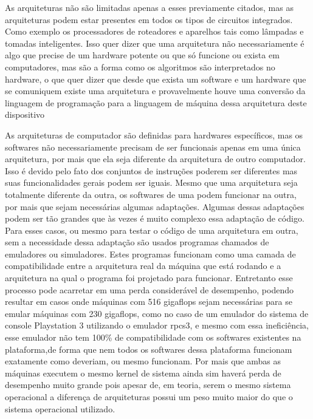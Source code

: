 \documentclass[
	12pt,				%
	openright,			%
	oneside,			%
	a4paper,			%
	english,			%
	french,				%
	spanish,			%
	brazil,				%
	]{abntex2}
\begin{document}
As arquiteturas não são limitadas apenas a esses previamente citados, mas as arquiteturas podem estar presentes em todos os tipos de circuitos integrados. Como exemplo os processadores de roteadores e aparelhos  tais como lâmpadas e tomadas inteligentes. Isso quer dizer que uma arquitetura não necessariamente é algo que precise de um hardware potente ou que só funcione ou exista em computadores, mas são a forma como os algoritmos são interpretados no hardware, o que quer dizer que desde que exista um software e um hardware que se comuniquem existe uma arquitetura e provavelmente houve uma conversão da linguagem de programação para a linguagem de máquina dessa arquitetura deste dispositivo\newline

As arquiteturas de computador são definidas para hardwares específicos, mas os softwares não necessariamente precisam de ser funcionais apenas em uma única arquitetura, por mais que ela seja diferente da arquitetura de outro computador. Isso é devido pelo fato dos conjuntos de instruções poderem ser diferentes mas suas funcionalidades gerais podem ser iguais. Mesmo que uma arquitetura seja totalmente diferente da outra, os softwares de uma podem funcionar na outra, por mais que sejam necessárias algumas adaptações. Algumas dessas adaptações podem ser tão grandes que às vezes é muito complexo essa adaptação de código. Para esses casos, ou mesmo para testar o código de uma arquitetura em outra, sem a necessidade dessa adaptação são usados programas chamados de emuladores ou simuladores. Estes programas funcionam como uma camada de compatibilidade entre a arquitetura real da máquina que está rodando e a arquitetura na qual o programa foi projetado para funcionar. Entretanto esse processo pode acarretar em uma perda considerável de desempenho, podendo resultar em casos onde máquinas com  516 gigaflops sejam necessárias para se emular máquinas com 230 gigaflops, como no caso de um emulador do sistema de console Playstation 3 utilizando o emulador rpcs3, e mesmo com essa ineficiência, esse emulador não tem 100\% de compatibilidade com os softwares existentes na plataforma,de forma que nem todos os softwares dessa plataforma funcionam exatamente como deveriam, ou mesmo funcionam. Por mais que ambas as máquinas executem o mesmo kernel de sistema ainda sim haverá perda de desempenho muito grande pois apesar de, em teoria, serem o mesmo sistema operacional a diferença de arquiteturas possui um peso muito maior do que o sistema operacional utilizado.\newline
\end{document}

